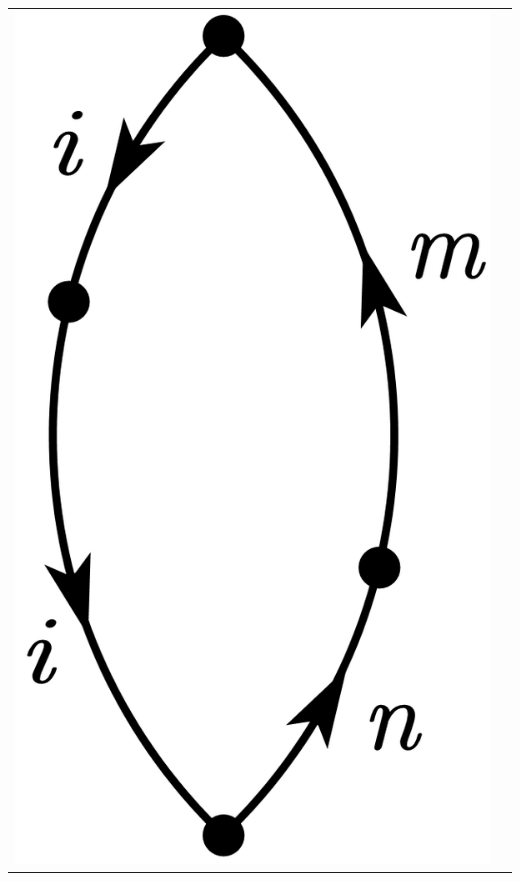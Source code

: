 \documentclass[a4paper]{book}
\newcounter{solution}[chapter]
\begin{document}
\begin{solution}
\begin{center}
\begin{tabular}{cc}
		\begin{minipage}{0.49\linewidth}
		\centering
		\includegraphics[scale=1.0,trim=0 -4 0 -4]{./pictures/6.02/3.png}
		\captionof*{figure}{$(-1)^{2+1} { \sum_{mn} }^\prime \frac{ V_{mi} V_{ii} V_{in} V_{nm} }{ ( E^{(0)}_i - E^{(0)}_n) ( E^{(0)}_i - E^{(0)}_m )^2 }$}
		\end{minipage}  &
			

\end{tabular}
\end{center}
\end{solution}
\end{document}
